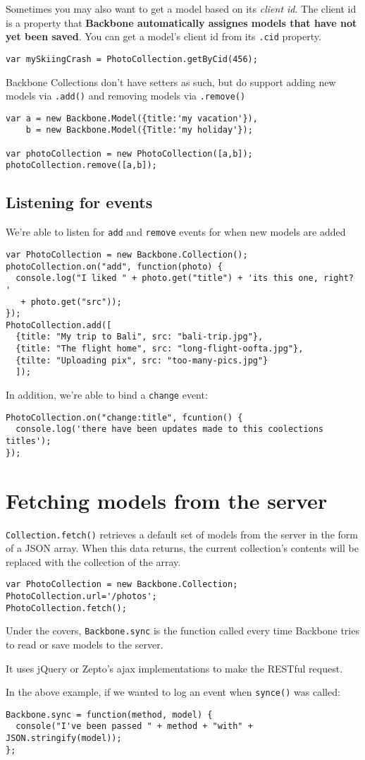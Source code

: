 \documentclass[a4paper, 11pt]{book}
\begin{document}
Sometimes you may also want to get a model based on its \emph{client id}. The
client id is a property that \textbf{Backbone automatically assignes models that
have not yet been saved}. You can get a model's client id from its \verb|.cid|
property.
\begin{verbatim}
var mySkiingCrash = PhotoCollection.getByCid(456);
\end{verbatim}
Backbone Collections don't have setters as such, but do support adding new
models via \verb|.add()| and removing models via \verb|.remove()|

\begin{verbatim}
var a = new Backbone.Model({title:'my vacation'}),
    b = new Backbone.Model({Title:'my holiday'});

var photoCollection = new PhotoCollection([a,b]);
photoCollection.remove([a,b]);
\end{verbatim}
\subsection{Listening for events}
We're able to listen for \verb|add| and \verb|remove| events for when new models
are added 
\begin{verbatim}
var PhotoCollection = new Backbone.Collection();
photoCollection.on("add", function(photo) {
  console.log("I liked " + photo.get("title") + 'its this one, right? '
   + photo.get("src"));
});
PhotoCollection.add([
  {title: "My trip to Bali", src: "bali-trip.jpg"},
  {title: "The flight home", src: "long-flight-oofta.jpg"},
  {tilte: "Uploading pix", src: "too-many-pics.jpg"}
  ]);
\end{verbatim}
In addition, we're able to bind a \verb|change| event:
\begin{verbatim}
PhotoCollection.on("change:title", fcuntion() {
  console.log('there have been updates made to this coolections titles');
});
\end{verbatim}
\section{Fetching models from the server}
\verb|Collection.fetch()| retrieves a default set of models from the server in
the form of a JSON array. When this data returns, the current collection's
contents will be replaced with the collection of the array.
\begin{verbatim}
var PhotoCollection = new Backbone.Collection;
PhotoCollection.url='/photos';
PhotoCollection.fetch();
\end{verbatim}
Under the covers, \verb|Backbone.sync| is the function called every time
Backbone tries to read or save models to the server.

It uses jQuery or Zepto's ajax implementations to make the RESTful request.

In the above example, if we wanted to log an event when \verb|synce()| was
called:
\begin{verbatim}
Backbone.sync = function(method, model) {
  console("I've been passed " + method + "with" + JSON.stringify(model));
};
\end{verbatim}
\end{document}
